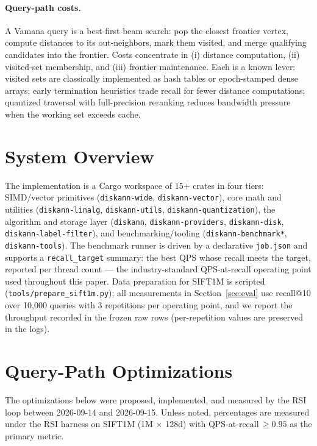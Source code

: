 \documentclass[11pt]{article}
\begin{document}
\paragraph{Query-path costs.} A Vamana query is a best-first beam search:
pop the closest frontier vertex, compute distances to its out-neighbors,
mark them visited, and merge qualifying candidates into the frontier.
Costs concentrate in (i) distance computation, (ii) visited-set membership,
and (iii) frontier maintenance. Each is a known lever: visited sets are
classically implemented as hash tables or epoch-stamped dense arrays;
early termination heuristics trade recall for fewer distance computations;
quantized traversal with full-precision reranking reduces bandwidth
pressure when the working set exceeds cache.

\section{System Overview}
\label{sec:system}
The implementation is a Cargo workspace of 15+ crates in four tiers:
SIMD/vector primitives (\texttt{diskann-wide}, \texttt{diskann-vector}),
core math and utilities (\texttt{diskann-linalg}, \texttt{diskann-utils},
\texttt{diskann-quantization}), the algorithm and storage layer
(\texttt{diskann}, \texttt{diskann-providers}, \texttt{diskann-disk},
\texttt{diskann-label-filter}), and benchmarking/tooling
(\texttt{diskann-benchmark*}, \texttt{diskann-tools}). The benchmark runner
is driven by a declarative \texttt{job.json} and supports a
\texttt{recall\_target} summary: the best QPS whose recall meets the target,
reported per thread count --- the industry-standard QPS-at-recall operating
point used throughout this paper. Data preparation for SIFT1M is scripted
(\texttt{tools/prepare\_sift1m.py}); all measurements in
Section~\ref{sec:eval} use recall@10 over 10{,}000 queries with 3
repetitions per operating point, and we report the throughput recorded in the
frozen raw rows (per-repetition values are preserved in the logs).

\section{Query-Path Optimizations}
\label{sec:opts}
The optimizations below were proposed, implemented, and measured by the RSI
loop between 2026-09-14 and 2026-09-15. Unless noted, percentages are
measured under the RSI harness on SIFT1M (1M $\times$ 128d) with
QPS-at-recall\,$\ge 0.95$ as the primary metric.
\end{document}
